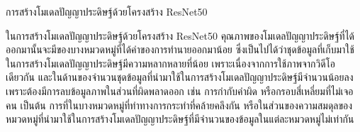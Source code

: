 การสร้างโมเดลปัญญาประดิษฐ์ด้วยโครงสร้าง ResNet50
\par
ในการสร้างโมเดลปัญญาประดิษฐ์ด้วยโครงสร้าง ResNet50 คุณภาพของโมเดลปัญญาประดิษฐ์ที่ได้ออกมานั้นจะมีของบางหมวดหมู่ที่ได้ค่าของการทำนายออกมาน้อย ซึ่งเป็นไปได้ว่าชุดข้อมูลที่เก็บมาใช้ในการสร้างโมเดลปัญญาประดิษฐ์มีความหลากหลายที่น้อย เพราะเนื่องจากการใช้ภาพจากวิดีโอเดียวกัน และในด้านของจำนวนชุดข้อมูลที่นำมาใช้ในการสร้างโมเดลปัญญาประดิษฐ์มีจำนวนน้อยลง เพราะต้องมีการลบข้อมูลภาพในส่วนที่ผิดพลาดออก เช่น การกำกับคำผิด หรือกรอบสี่เหลี่ยมที่ไม่เจอคน เป็นต้น การที่ในบางหมวดหมู่ที่ท่าทางการกระทำที่คล้ายคลึงกัน หรือในส่วนของความสมดุลของหมวดหมู่ที่นำมาใช้ในการสร้างโมเดลปัญญาประดิษฐ์ที่มีจำนวนของข้อมูลในแต่ละหมวดหมู่ไม่เท่ากัน
